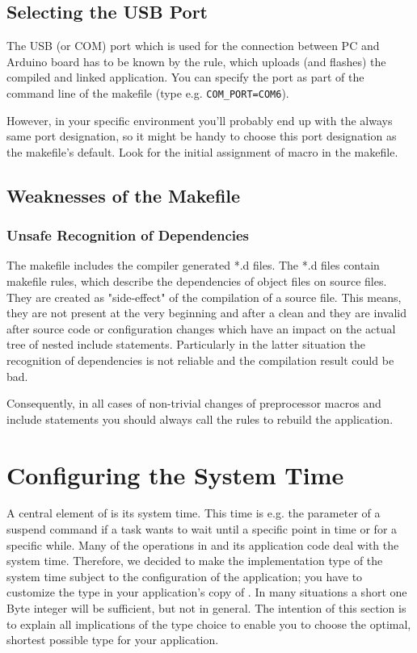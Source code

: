 \subsection{Selecting the USB Port}

The USB (or COM) port which is used for the connection between PC and
Arduino board has to be known by the rule, which uploads (and flashes)
the compiled and linked application. You can specify the port as part of
the command line of the makefile (type e.g. \verb+COM_PORT=COM6+).

However, in your specific environment you'll probably end up with the
always same port designation, so it might be handy to choose this port
designation as the makefile's default. Look for the initial assignment of
macro  in the makefile.


\subsection{Weaknesses of the Makefile}

\subsubsection{Unsafe Recognition of Dependencies}

The makefile includes the compiler generated *.d files. The *.d files
contain makefile rules, which describe the dependencies of object files on
source files. They are created as "side-effect" of the compilation of a
source file. This means, they are not present at the very beginning and
after a clean and they are invalid after source code or configuration
changes which have an impact on the actual tree of nested include
statements. Particularly in the latter situation the recognition of
dependencies is not reliable and the compilation result could be bad.

Consequently, in all cases of non-trivial changes of preprocessor macros
and include statements you should always call the rules to rebuild the
application.


\section{Configuring the System Time}
\label{secSystemTime}

A central element of \rtos{} is its system time. This time is e.g. the
parameter of a suspend command if a task wants to wait until a specific
point in time or for a specific while. Many of the
operations in \rtos{} and its application code deal with the system time.
Therefore, we decided to make the implementation type of the system time
subject to the configuration of the application; you have to customize the
type in your application's copy of . In many
situations a short one Byte integer will be sufficient, but not in
general. The intention of this section is to explain all implications of
the type choice to enable you to choose the optimal, shortest possible
type for your application.


